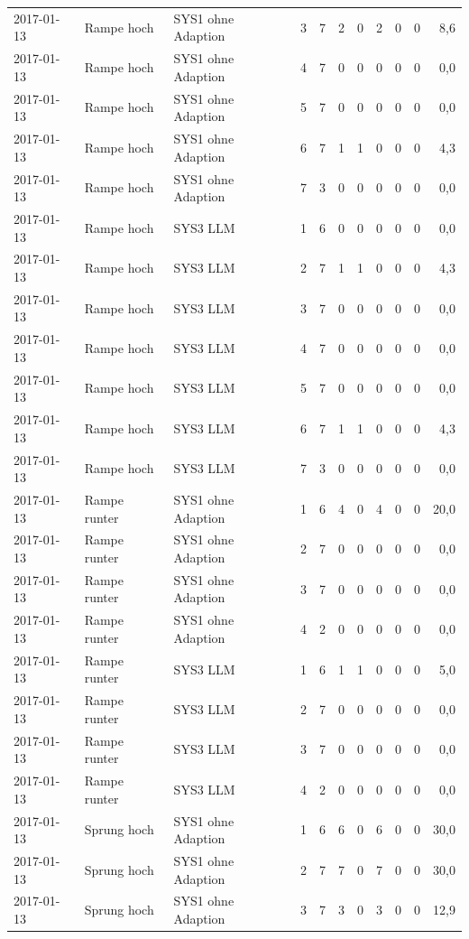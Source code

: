 \begin{tabular}{lllrrrrrrrr}
2017-01-13 & Rampe hoch & SYS1 ohne Adaption & 3 & 7 & 2 & 0 & 2 & 0 & 0 & 8,6 \\
2017-01-13 & Rampe hoch & SYS1 ohne Adaption & 4 & 7 & 0 & 0 & 0 & 0 & 0 & 0,0 \\
2017-01-13 & Rampe hoch & SYS1 ohne Adaption & 5 & 7 & 0 & 0 & 0 & 0 & 0 & 0,0 \\
2017-01-13 & Rampe hoch & SYS1 ohne Adaption & 6 & 7 & 1 & 1 & 0 & 0 & 0 & 4,3 \\
2017-01-13 & Rampe hoch & SYS1 ohne Adaption & 7 & 3 & 0 & 0 & 0 & 0 & 0 & 0,0 \\
2017-01-13 & Rampe hoch & SYS3 LLM & 1 & 6 & 0 & 0 & 0 & 0 & 0 & 0,0 \\
2017-01-13 & Rampe hoch & SYS3 LLM & 2 & 7 & 1 & 1 & 0 & 0 & 0 & 4,3 \\
2017-01-13 & Rampe hoch & SYS3 LLM & 3 & 7 & 0 & 0 & 0 & 0 & 0 & 0,0 \\
2017-01-13 & Rampe hoch & SYS3 LLM & 4 & 7 & 0 & 0 & 0 & 0 & 0 & 0,0 \\
2017-01-13 & Rampe hoch & SYS3 LLM & 5 & 7 & 0 & 0 & 0 & 0 & 0 & 0,0 \\
2017-01-13 & Rampe hoch & SYS3 LLM & 6 & 7 & 1 & 1 & 0 & 0 & 0 & 4,3 \\
2017-01-13 & Rampe hoch & SYS3 LLM & 7 & 3 & 0 & 0 & 0 & 0 & 0 & 0,0 \\
2017-01-13 & Rampe runter & SYS1 ohne Adaption & 1 & 6 & 4 & 0 & 4 & 0 & 0 & 20,0 \\
2017-01-13 & Rampe runter & SYS1 ohne Adaption & 2 & 7 & 0 & 0 & 0 & 0 & 0 & 0,0 \\
2017-01-13 & Rampe runter & SYS1 ohne Adaption & 3 & 7 & 0 & 0 & 0 & 0 & 0 & 0,0 \\
2017-01-13 & Rampe runter & SYS1 ohne Adaption & 4 & 2 & 0 & 0 & 0 & 0 & 0 & 0,0 \\
2017-01-13 & Rampe runter & SYS3 LLM & 1 & 6 & 1 & 1 & 0 & 0 & 0 & 5,0 \\
2017-01-13 & Rampe runter & SYS3 LLM & 2 & 7 & 0 & 0 & 0 & 0 & 0 & 0,0 \\
2017-01-13 & Rampe runter & SYS3 LLM & 3 & 7 & 0 & 0 & 0 & 0 & 0 & 0,0 \\
2017-01-13 & Rampe runter & SYS3 LLM & 4 & 2 & 0 & 0 & 0 & 0 & 0 & 0,0 \\
2017-01-13 & Sprung hoch & SYS1 ohne Adaption & 1 & 6 & 6 & 0 & 6 & 0 & 0 & 30,0 \\
2017-01-13 & Sprung hoch & SYS1 ohne Adaption & 2 & 7 & 7 & 0 & 7 & 0 & 0 & 30,0 \\
2017-01-13 & Sprung hoch & SYS1 ohne Adaption & 3 & 7 & 3 & 0 & 3 & 0 & 0 & 12,9 \\

\end{tabular}
